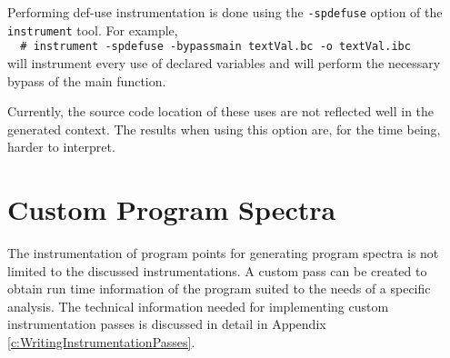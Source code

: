 	Performing def-use instrumentation is done using the \verb|-spdefuse| option of the \verb|instrument| tool.
	For example,\\
	\verb|  # instrument -spdefuse -bypassmain textVal.bc -o textVal.ibc|\\
	will instrument every use of declared variables and will perform the necessary bypass of the main function.
	
	Currently, the source code location of these uses are not reflected well in the generated context.
	The results when using this option are, for the time being, harder to interpret.

	
\section{Custom Program Spectra}

	The instrumentation of program points for generating program spectra is not limited to the discussed instrumentations.
	A custom pass can be created to obtain run time information of the program 
	suited to the needs of a specific analysis.
	The technical information needed for implementing custom instrumentation passes 
	is discussed in detail in Appendix \ref{c:WritingInstrumentationPasses}.
	
	
	

	  
